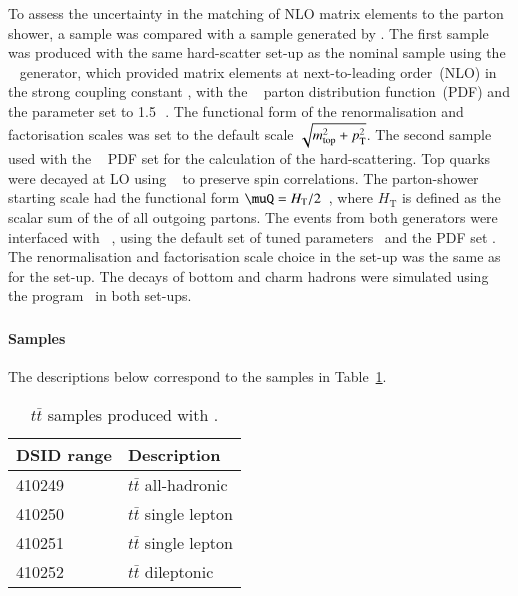 To assess the uncertainty in the matching of NLO matrix elements to the parton shower, 
a \POWHEG sample was compared with a sample generated by \MGNLO. 
The first sample was produced with the same hard-scatter set-up as the nominal sample using the 
\POWHEGBOX[v2]~\cite{Frixione:2007nw,Nason:2004rx,Frixione:2007vw,Alioli:2010xd}
generator, which provided matrix elements at next-to-leading
order~(NLO) in the strong coupling constant \alphas, with the
\NNPDF[3.0nlo]~\cite{Ball:2014uwa} parton distribution function~(PDF) and
the \hdamp parameter set to 1.5\,\mtop~\cite{ATL-PHYS-PUB-2016-020}.
The functional form of the renormalisation and factorisation scales was
set to the default scale $\sqrt{m_{\textrm{top}}^2 + p_{\textrm T}^2}$.  
The second sample used \MGNLO[2.6.0] with the 
\NNPDF[3.0nlo]~\cite{Ball:2014uwa} PDF set for the calculation of the hard-scattering.
Top quarks were decayed at LO using
\MADSPIN~\cite{Frixione:2007zp,Artoisenet:2012st} to preserve spin
correlations. The parton-shower starting
scale had the functional form $\muQ = H_{\mathrm T}/2$~\cite{ATL-PHYS-PUB-2017-007}, 
where $H_{\mathrm T}$ is defined
as the scalar sum of the \pT of all outgoing partons.
The events from both generators were interfaced with
\HERWIG[7.13]~\cite{Bahr:2008pv,Bellm:2015jjp}, using the \HERWIG[7.1] default set
of tuned parameters~\cite{Bellm:2015jjp} and the \MMHT[lo] PDF set
\cite{Harland-Lang:2014zoa}.
The renormalisation and factorisation scale choice in the \MGNLO set-up was the same as for the
\POWHEGBOX set-up. The decays of bottom and charm hadrons were simulated
using the \EVTGEN[1.6.0] program~\cite{Lange:2001uf} in both set-ups.

\subsubsection[Sherpa 2.2.1]{\SHERPA[2.2.1]}
\label{subsubsec:ttbar_sherpa}

\paragraph{Samples}

The descriptions below correspond to the samples in Table~\ref{tab:ttbar_sherpa}.
\begin{table}[htbp]
\begin{center}
\caption{$t\bar{t}$ samples produced with \SHERPA[2.2.1].}
\label{tab:ttbar_sherpa}
\begin{tabular}{ l | l }
\hline
DSID range & Description \\
\hline
410249 & $t\bar{t}$ all-hadronic  \\
410250 & $t\bar{t}$ single lepton  \\
410251 & $t\bar{t}$ single lepton  \\
410252 & $t\bar{t}$ dileptonic  \\
\hline
\end{tabular}
\end{center}
\end{table}


